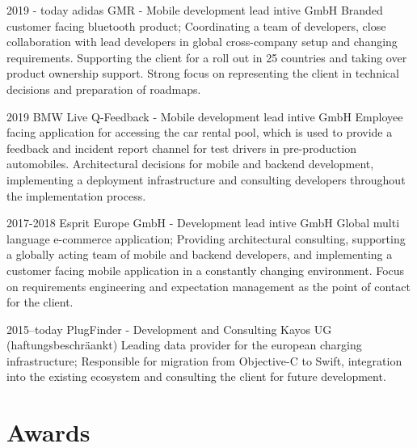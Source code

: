 \documentclass[]{friggeri-cv} %
\begin{document}
\begin{entrylist}
	
	\entry
	{2019 - today}
	{adidas GMR - Mobile development lead}
	{intive GmbH}
	{Branded customer facing bluetooth product; Coordinating a team of developers, close collaboration with lead developers in global cross-company setup and changing requirements. Supporting the client for a roll out in 25 countries and taking over product ownership support. Strong focus on representing the client in technical decisions and preparation of roadmaps.}
	
	
	
	\entry
	{2019}
	{BMW Live Q-Feedback - Mobile development lead}
	{intive GmbH}
	{Employee facing application for accessing the car rental pool, which is used to provide a feedback and incident report channel for test drivers in pre-production automobiles. Architectural decisions for mobile and backend development, implementing a deployment infrastructure and consulting developers throughout the implementation process.}
	
	
	\entry
	{2017-2018}
	{Esprit Europe GmbH - Development lead}
	{intive GmbH}
	{Global multi language e-commerce application; Providing architectural consulting, supporting a globally acting team of mobile and backend developers, and implementing a customer facing mobile application in a constantly changing environment. Focus on requirements engineering and expectation management as the point of contact for the client.}
	
	
	\entry
	{2015--today}
	{PlugFinder - Development and Consulting}
	{Kayos UG (haftungsbeschr\"{a}ankt)}
	{Leading data provider for the european charging infrastructure; Responsible for migration from Objective-C to Swift, integration into the existing ecosystem and consulting the client for future development.}

\end{entrylist}


\section{Awards}
\end{document}
